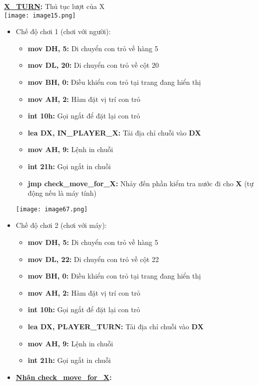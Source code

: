 \textbf{\underline{X\_TURN}: }Thủ tục lượt của X\\
\texttt{[image: image15.png]}

\begin{itemize}
    \item Chế độ chơi 1 (chơi với người):
    \begin{itemize}
        \item \textbf{mov DH, 5:} Di chuyển con trỏ về hàng 5
        \item \textbf{mov DL,  20:} Di chuyển con trỏ về cột 20
        \item \textbf{mov BH, 0:} Điều khiển con trỏ tại trang đang hiển thị 
        \item \textbf{mov AH, 2:} Hàm đặt vị trí con trỏ
        \item \textbf{int 10h: }Gọi ngắt để đặt lại con trỏ
        \item \textbf{lea DX, IN\_PLAYER\_X: }Tải địa chỉ chuỗi vào \textbf{DX}
        \item \textbf{mov AH, 9: }Lệnh in chuỗi
        \item \textbf{int 21h: }Gọi ngắt in chuỗi
        \item \textbf{jmp check\_move\_for\_X: }Nhảy đến phần kiểm tra nước đi cho \textbf{X} (tự động nếu là máy tính)
    \end{itemize}
    \texttt{[image: image67.png]}
    \item Chế độ chơi 2 (chơi với máy):
    \begin{itemize}
        \item \textbf{mov DH, 5:} Di chuyển con trỏ về hàng 5
        \item \textbf{mov DL,  22:} Di chuyển con trỏ về cột 22
        \item \textbf{mov BH, 0:} Điều khiển con trỏ tại trang đang hiển thị 
        \item \textbf{mov AH, 2:} Hàm đặt vị trí con trỏ
        \item \textbf{int 10h:} Gọi ngắt để đặt lại con trỏ
        \item \textbf{lea DX, PLAYER\_TURN: }Tải địa chỉ chuỗi vào \textbf{DX}
        \item \textbf{mov AH, 9: }Lệnh in chuỗi
        \item \textbf{int 21h:} Gọi ngắt in chuỗi
    \end{itemize} 
    \item \textbf{\underline{Nhãn check\_move\_for\_X}: }\\

\end{itemize}
